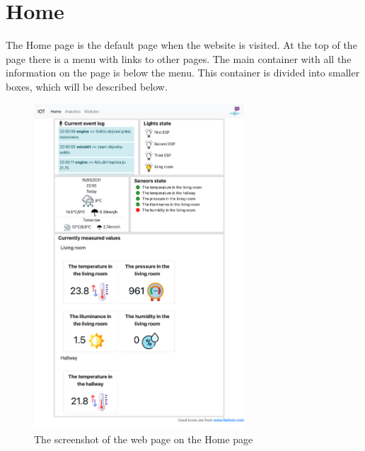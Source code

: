 


\section{Home}

The Home page is the default page when the website is visited. At the top of the page there is a menu with links to other pages. The main container with all the information on the page is below the menu. This container is divided into smaller boxes, which will be described below.

\begin{figure}[H]
    \centering
    \includegraphics[width=0.7\textwidth]{img/web_home.png}
    \caption{The screenshot of the web page on the Home page}
    \label{fig:web_home}
\end{figure}

